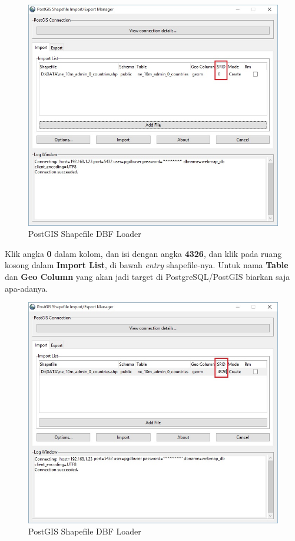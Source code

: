 \documentclass[]{book}
\begin{document}
\begin{itemize}
  \begin{figure}
  \centering
  \includegraphics{./img/postgis-loader-srid-column.jpg}
  \caption{PostGIS Shapefile DBF Loader}
  \end{figure}

  Klik angka \textbf{0} dalam kolom, dan isi dengan angka \textbf{4326}, dan klik pada ruang kosong dalam \textbf{Import List}, di bawah \emph{entry} shapefile-nya. Untuk nama \textbf{Table} dan \textbf{Geo Column} yang akan jadi target di PostgreSQL/PostGIS biarkan saja apa-adanya.

  \begin{figure}
  \centering
  \includegraphics{./img/postgis-loader-4326.jpg}
  \caption{PostGIS Shapefile DBF Loader}
  \end{figure}


\end{itemize}
\end{document}
